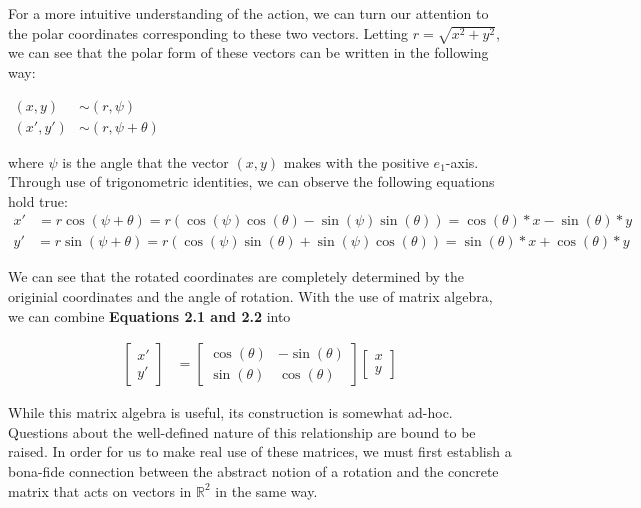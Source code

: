 \documentclass[10pt]{ucthesis}
\newcommand{\R}{\mathbb{R}}
\begin{document}
For a more intuitive understanding of the action, we can turn our attention to the polar coordinates corresponding to these two vectors. Letting $r = \sqrt{x^2 + y^2}$, we can see that the polar form of these vectors can be written in the following way:
\begin{center}
	$\begin{aligned}
		(x,y) &\sim (r,\psi)\\
		(x',y') &\sim (r,\psi+\theta)
	\end{aligned}$
\end{center}
where $\psi$ is the angle that the vector $(x,y)$ makes with the positive $e_1$-axis. Through use of trigonometric identities, we can observe the following equations hold true:
\begin{equation}
	\begin{aligned}
		x' &= r\cos(\psi+\theta) = r\left(\cos(\psi)\cos(\theta) - \sin(\psi)\sin(\theta)\right) = \cos(\theta)*x -\sin(\theta)*y
	\end{aligned}
\end{equation}
\begin{equation}
	\begin{aligned}
		y' &= r\sin(\psi+\theta) = r\left(\cos(\psi)\sin(\theta) + \sin(\psi)\cos(\theta)\right) = \sin(\theta)*x +\cos(\theta)*y
	\end{aligned}
\end{equation}

We can see that the rotated coordinates are completely determined by the originial coordinates and the angle of rotation. With the use of matrix algebra, we can combine \textbf{Equations 2.1 and 2.2} into 

\begin{equation}
	\begin{aligned}
		\begin{bmatrix}
			x' \\
			y'
		\end{bmatrix} &=
		\begin{bmatrix}
			\cos(\theta) & -\sin(\theta) \\
			\sin(\theta) & \cos(\theta)
		\end{bmatrix}
		\begin{bmatrix}
			x \\
			y
		\end{bmatrix}
	\end{aligned}
\end{equation}

While this matrix algebra is useful, its construction is somewhat ad-hoc. Questions about the well-defined nature of this relationship are bound to be raised. In order for us to make real use of these matrices, we must first establish a bona-fide connection between the abstract notion of a rotation and the concrete matrix that acts on vectors in $\R^2$ in the same way.
\end{document}
